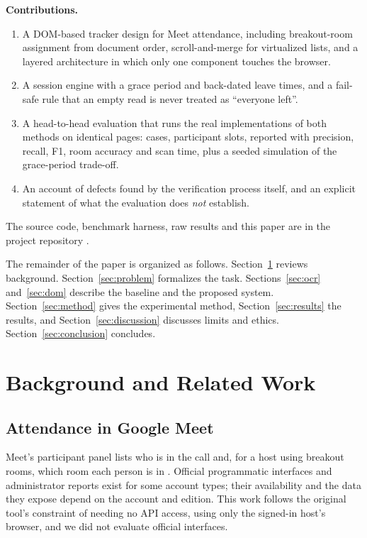 \documentclass[conference]{IEEEtran}
\begin{document}
\textbf{Contributions.}
\begin{enumerate}
\item A DOM-based tracker design for Meet attendance, including breakout-room assignment from document order, scroll-and-merge for virtualized lists, and a layered architecture in which only one component touches the browser.
\item A session engine with a grace period and back-dated leave times, and a fail-safe rule that an empty read is never treated as ``everyone left''.
\item A head-to-head evaluation that runs the real implementations of both methods on identical pages: \nCases{} cases, \nSlots{} participant slots, reported with precision, recall, F1, room accuracy and scan time, plus a seeded simulation of the grace-period trade-off.
\item An account of defects found by the verification process itself, and an explicit statement of what the evaluation does \emph{not} establish.
\end{enumerate}
The source code, benchmark harness, raw results and this paper are in the project repository \cite{repo}.

The remainder of the paper is organized as follows. Section~\ref{sec:related} reviews background. Section~\ref{sec:problem} formalizes the task. Sections~\ref{sec:ocr} and~\ref{sec:dom} describe the baseline and the proposed system. Section~\ref{sec:method} gives the experimental method, Section~\ref{sec:results} the results, and Section~\ref{sec:discussion} discusses limits and ethics. Section~\ref{sec:conclusion} concludes.

\section{Background and Related Work}\label{sec:related}
\subsection{Attendance in Google Meet}
Meet's participant panel lists who is in the call and, for a host using breakout rooms, which room each person is in \cite{meethelp}. Official programmatic interfaces and administrator reports exist for some account types; their availability and the data they expose depend on the account and edition. This work follows the original tool's constraint of needing no API access, using only the signed-in host's browser, and we did not evaluate official interfaces.
\end{document}
